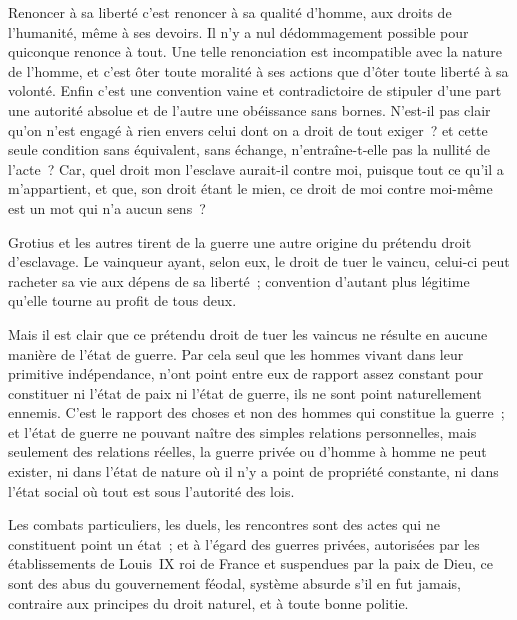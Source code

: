 \documentclass[french,twoside]{book} %
\begin{document}
Renoncer à sa liberté c’est renoncer à sa qualité d’homme, aux droits de l’humanité, même à ses devoirs. Il n’y a nul dédommagement possible pour quiconque renonce à tout. Une telle renonciation est incompatible avec la nature de l’homme, et c’est ôter toute moralité à ses actions que d’ôter toute liberté à sa volonté. Enfin c’est une convention vaine et contradictoire de stipuler d’une part une autorité absolue et de l’autre une obéissance sans bornes. N’est-il pas clair qu’on n’est engagé à rien envers celui dont on a droit de tout exiger ? et cette seule condition sans équivalent, sans échange, n’entraîne-t-elle pas la nullité de l’acte ? Car, quel droit mon l’esclave aurait-il contre moi, puisque tout ce qu’il a m’appartient, et que, son droit étant le mien, ce droit de moi contre moi-même est un mot qui n’a aucun sens ?\par
Grotius et les autres tirent de la guerre une autre origine du prétendu droit d’esclavage. Le vainqueur ayant, selon eux, le droit de tuer le vaincu, celui-ci peut racheter sa vie aux dépens de sa liberté ; convention d’autant plus légitime qu’elle tourne au profit de tous deux.\par
Mais il est clair que ce prétendu droit de tuer les vaincus ne résulte en aucune manière de l’état de guerre. Par cela seul que les hommes vivant dans leur primitive indépendance, n’ont point entre eux de rapport assez constant pour constituer ni l’état de paix ni l’état de guerre, ils ne sont point naturellement ennemis. C’est le rapport des choses et non des hommes qui constitue la guerre ; et l’état de guerre ne pouvant naître des simples relations personnelles, mais seulement des relations réelles, la guerre privée ou d’homme à homme ne peut exister, ni dans l’état de nature où il n’y a point de propriété constante, ni dans l’état social où tout est sous l’autorité des lois.\par
Les combats particuliers, les duels, les rencontres sont des actes qui ne constituent point un état ; et à l’égard des guerres privées, autorisées par les établissements de Louis IX roi de France et suspendues par la paix de Dieu, ce sont des abus du gouvernement féodal, système absurde s’il en fut jamais, contraire aux principes du droit naturel, et à toute bonne politie.\par
\end{document}
